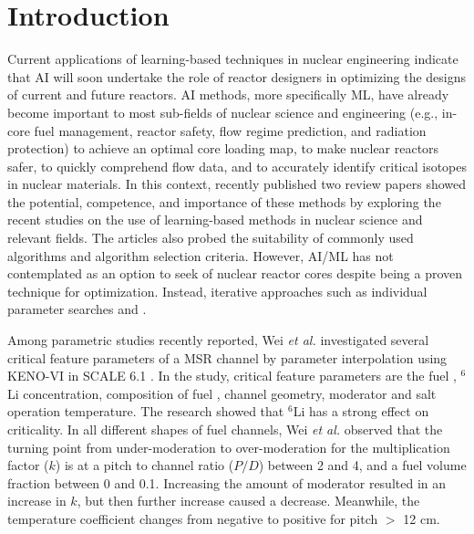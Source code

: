 \section{Introduction}

    Current applications of learning-based techniques in nuclear engineering indicate that \gls{AI} will soon undertake the role of reactor designers in optimizing the designs of current and future reactors. \gls{AI} methods, more specifically \gls{ML}, have already become important to most sub-fields of nuclear science and engineering (e.g., in-core fuel management, reactor safety, flow regime prediction, and radiation protection) to achieve an optimal core loading map, to make nuclear reactors safer, to quickly comprehend flow data, and to accurately identify critical isotopes in nuclear materials. In this context, recently published two review papers \cite{Gomez2020, Nissan2019} showed the potential, competence, and importance of these methods by exploring the recent studies on the use of learning-based methods in nuclear science and relevant fields. The articles also probed the suitability of \DIFaddbegin {}\DIFaddend commonly used algorithms and algorithm selection criteria. However, \gls{AI}/\gls{ML} has not contemplated as an option to seek \DIFdelbegin {}\DIFdelend \DIFaddbegin {}\DIFaddend of nuclear reactor cores despite being a proven technique for optimization. Instead, \DIFdelbegin {}\DIFdelend iterative approaches such as individual parameter searches and \DIFdelbegin %
\DIFdelend \DIFaddbegin {}\DIFaddend .

    Among \DIFdelbegin {}\DIFdelend parametric studies recently reported, Wei \emph{et al.} \cite{Wei2018} investigated several critical feature parameters of a \gls{MSR} channel by parameter interpolation using KENO-VI in SCALE 6.1 \cite{scale2020}. In the study, \DIFdelbegin {}\DIFdelend critical feature parameters are the fuel \DIFdelbegin {}\DIFdelend \DIFaddbegin {}\DIFaddend , $^{6}$Li concentration, composition of fuel \DIFdelbegin {}\DIFdelend \DIFaddbegin {}\DIFaddend , channel geometry, moderator \DIFdelbegin {}\DIFdelend \DIFaddbegin {}\DIFaddend and salt operation temperature. The research showed that $^{6}$Li has a strong effect on \DIFdelbegin {}\DIFdelend criticality. In all different shapes of fuel channels, Wei \emph{et al.} \cite{Wei2018} observed that the turning point from under-moderation to over-moderation for the multiplication factor ($k$) is at a pitch to channel ratio ($P/D$) between 2 and 4, and a fuel volume fraction between 0 and 0.1. Increasing the amount of moderator resulted in an increase in $k$, but then further increase caused a decrease. Meanwhile, the temperature coefficient changes from negative to positive for pitch $>$ 12 cm.

